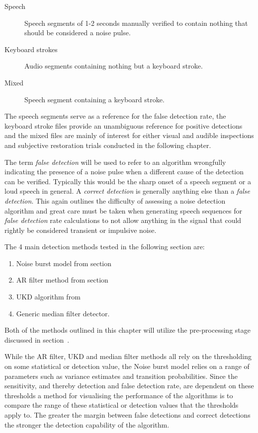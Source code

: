 \begin{description}
  \item[Speech] Speech segments of 1-2 seconds manually verified to contain nothing that should be considered a noise pulse.
  \item[Keyboard strokes] Audio segments containing nothing but a keyboard stroke.
  \item[Mixed] Speech segment containing a keyboard stroke.
\end{description}

The speech segments serve as a reference for the false detection rate, the keyboard stroke files provide an unambiguous reference for positive detections and the mixed files are mainly of interest for either visual and audible inspections and subjective restoration trials conducted in the following chapter.

The term \emph{false detection} will be used to refer to an algorithm wrongfully indicating the presence of a noise pulse when a different cause of the detection can be verified. Typically this would be the sharp onset of a speech segment or a loud speech in general. A \emph{correct detection} is generally anything else than a \emph{false detection}. This again outlines the difficulty of assessing a noise detection algorithm and great care must be taken when generating speech sequences for \emph{false detection} rate calculations to not allow anything in the signal that could rightly be considered transient or impulsive noise.

The 4 main detection methods tested in the following section are:
\begin{enumerate}
  \item Noise burst model from section~\label{sec:WPdetectionNB}
  \item AR filter method from section~\label{sec:WPdetectionAR}
  \item UKD algorithm from \cite{Subramanya2007}
  \item Generic median filter detector.
\end{enumerate}
Both of the methods outlined in this chapter will utilize the pre-processing stage discussed in section~\label{sec:WPdetectionSep}.

While the AR filter, UKD and median filter methods all rely on the thresholding on some statistical or detection value, the Noise burst model relies on a range of parameters such as variance estimates and transition probabilities. Since the sensitivity, and thereby detection and false detection rate, are dependent on these thresholds a method for visualising the performance of the algorithms is to compare the range of these statistical or detection values that the thresholds apply to. The greater the margin between false detections and correct detections the stronger the detection capability of the algorithm.

